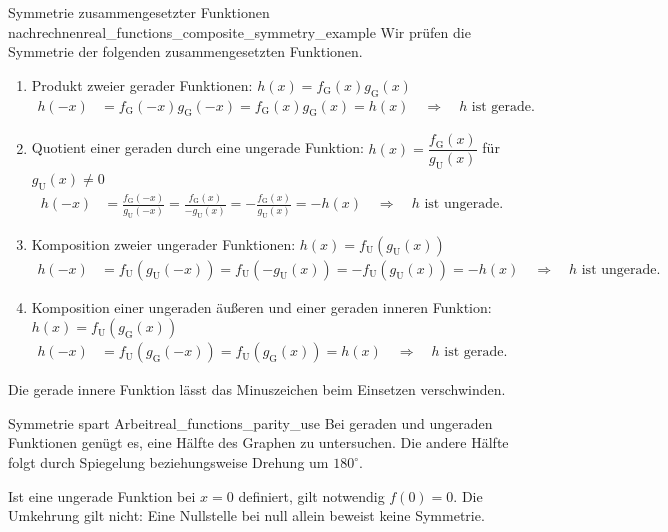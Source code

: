 \begin{ExampleBox}{Symmetrie zusammengesetzter Funktionen nachrechnen}{real_functions_composite_symmetry_example}
  Wir prüfen die Symmetrie der folgenden zusammengesetzten Funktionen.
  \begin{enumerate}[label=\alph*),leftmargin=*,itemsep=0.25em,topsep=0.3em]
    \item Produkt zweier gerader Funktionen: $h(x)=f_{\mathrm G}(x)g_{\mathrm G}(x)$
      \[
        \begin{aligned}
          h(-x)&=f_{\mathrm G}(-x)g_{\mathrm G}(-x)
          =f_{\mathrm G}(x)g_{\mathrm G}(x)=h(x)
          \quad\Longrightarrow\quad h\text{ ist gerade.}
        \end{aligned}
      \]
    \item Quotient einer geraden durch eine ungerade Funktion:
      $h(x)=\dfrac{f_{\mathrm G}(x)}{g_{\mathrm U}(x)}$ für $g_{\mathrm U}(x)\ne0$
      \[
        \begin{aligned}
          h(-x)&=\frac{f_{\mathrm G}(-x)}{g_{\mathrm U}(-x)}
          =\frac{f_{\mathrm G}(x)}{-g_{\mathrm U}(x)}
          =-\frac{f_{\mathrm G}(x)}{g_{\mathrm U}(x)}=-h(x)
          \quad\Longrightarrow\quad h\text{ ist ungerade.}
        \end{aligned}
      \]
    \item Komposition zweier ungerader Funktionen:
      $h(x)=f_{\mathrm U}(g_{\mathrm U}(x))$
      \[
        \begin{aligned}
          h(-x)&=f_{\mathrm U}(g_{\mathrm U}(-x))
          =f_{\mathrm U}(-g_{\mathrm U}(x))
          =-f_{\mathrm U}(g_{\mathrm U}(x))=-h(x)
          \quad\Longrightarrow\quad h\text{ ist ungerade.}
        \end{aligned}
      \]
    \item Komposition einer ungeraden äußeren und einer geraden inneren Funktion:
      $h(x)=f_{\mathrm U}(g_{\mathrm G}(x))$
      \[
        \begin{aligned}
          h(-x)&=f_{\mathrm U}(g_{\mathrm G}(-x))
          =f_{\mathrm U}(g_{\mathrm G}(x))=h(x)
          \quad\Longrightarrow\quad h\text{ ist gerade.}
        \end{aligned}
      \]
  \end{enumerate}
  Die gerade innere Funktion lässt das Minuszeichen beim Einsetzen verschwinden.
\end{ExampleBox}
\begin{KeyPointBox}{Symmetrie spart Arbeit}{real_functions_parity_use}
  Bei geraden und ungeraden Funktionen genügt es, eine Hälfte des Graphen
  zu untersuchen. Die andere Hälfte folgt durch Spiegelung beziehungsweise
  Drehung um $180^\circ$.

  Ist eine ungerade Funktion bei $x=0$ definiert, gilt notwendig
  $f(0)=0$. Die Umkehrung gilt nicht: Eine Nullstelle bei null allein
  beweist keine Symmetrie.
\end{KeyPointBox}
